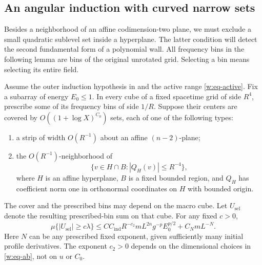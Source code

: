 \subsection{An angular induction with curved narrow sets}

Besides a neighborhood of an affine codimension-two plane, we must
exclude a small quadratic sublevel set inside a hyperplane.  The latter
condition will detect the second fundamental form of a polynomial wall.
All frequency bins in the following lemma are bins of the original
unrotated grid.  Selecting a bin means selecting its entire field.

\begin{lemma}\label{w:angular}
Assume the outer induction hypothesis in  and the active
range \eqref{w:eq-active}.  Fix a subarray of energy $E_0\leq1$.
In every cube of a fixed spacetime grid of side $R^4$, prescribe some
of its frequency bins of side $1/R$.  Suppose their centers are covered
by $O((1+\log X)^{C_0})$ sets, each of one of the following types:
\begin{enumerate}[label=\textup{(\alph*)}]
\item a strip of width $O(R^{-1})$ about an affine $(n-2)$-plane;
\item the $O(R^{-1})$-neighborhood of
\[
 \{v\in H\cap B: |Q_H(v)|\leq R^{-4}\},
\]
where $H$ is an affine hyperplane, $B$ is a fixed bounded region,
and $Q_H$ has coefficient norm one in orthonormal coordinates on $H$
with bounded origin.
\end{enumerate}
The cover and the prescribed bins may depend on the macro cube.  Let
$U_{\mathrm{sel}}$ denote the resulting prescribed-bin sum on that cube.
For any fixed $c>0$,
\begin{equation}\label{w:eq-angular}
 \mu\{|U_{\mathrm{sel}}|\geq c\lambda\}
 \leq C C_{\mathrm{ind}}R^{-c_2}
       mL^{2n}g^{-p}E_0^{p/2}+C_NmL^{-N}.
\end{equation}
Here $N$ can be any prescribed fixed exponent, given sufficiently many
initial profile derivatives.  The exponent $c_2>0$ depends on the
dimensional choices in \eqref{w:eq-ab}, not on $u$ or $C_0$.
\end{lemma}

